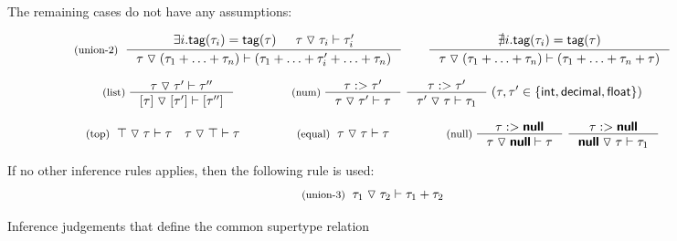 \documentclass[10pt]{sigplanconf}
\newcommand{\tsep}[0]{\; \triangledown \;}
\newcommand{\kvd}[1]{\textbf{\sffamily #1}}
\newcommand{\ident}[1]{\textnormal{\sffamily #1}}
\newcommand{\tytagof}{\ident{tag}}
\begin{document}
\begin{figure}[t]
\small{
The remaining cases do not have any assumptions:}

\begin{equation*}
\textnormal{\footnotesize{(union-2)}}\;\;
\inference
  {\exists i . \tytagof(\tau_i) = \tytagof(\tau) & \tau \tsep \tau_i \vdash \tau_i'}
  {\tau \tsep (\tau_1 + \ldots + \tau_n) \vdash (\tau_1 + \ldots + \tau_i' + \ldots + \tau_n)}
\quad\quad
\inference
  {\nexists i . \tytagof(\tau_i) = \tytagof(\tau)}
  {\tau \tsep (\tau_1 + \ldots + \tau_n) \vdash (\tau_1 + \ldots + \tau_n + \tau)}
\end{equation*}


\begin{equation*}
\inference[(list)\;]
  {\tau \tsep \tau' \vdash \tau''}
  {[\tau] \tsep [\tau'] \vdash [\tau'']}
%
\quad\quad\quad
%
\inference[(num)\;]
  {\tau :> \tau'}
  {\tau \tsep \tau' \vdash \tau}\;
\inference
  {\tau :> \tau'}
  {\tau' \tsep \tau \vdash \tau_1}
\;(\tau, \tau' \in \{\ident{int}, \ident{decimal}, \ident{float} \})
\end{equation*}

\begin{equation*}
\textnormal{\footnotesize{(top)}}\;\;
\top \tsep \tau \vdash \tau \quad
\tau \tsep \top \vdash \tau
%
\quad\quad\quad
%
\textnormal{\footnotesize{(equal)}}\;\;
\tau \tsep \tau \vdash \tau
%
\quad\quad\quad
%
\inference[(null)\;]
  {\tau :> \kvd{null}}
  {\tau \tsep \kvd{null} \vdash \tau}\;
\inference
  {\tau :> \kvd{null}}
  {\kvd{null} \tsep \tau \vdash \tau_1}
\end{equation*}

\vspace{0.5em}
\small{
If no other inference rules applies, then the following rule is used:}
\begin{equation*}
\textnormal{\footnotesize{(union-3)}}\;\;
\tau_1 \tsep \tau_2 \vdash \tau_1 + \tau_2
\end{equation*}
\vspace{-1em}
\caption{Inference judgements that define the common supertype relation}
\label{fig:subtyping-cst}
\end{figure}

\end{document}
